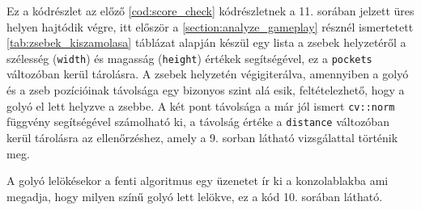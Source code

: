 \par Ez a kódrészlet az előző \ref{cod:score_check} kódrészletnek a 11. sorában jelzett üres helyen hajtódik végre, itt először a \ref{section:analyze_gameplay} résznél ismertetett \ref{tab:zsebek_kiszamolasa} táblázat alapján készül egy lista a zsebek helyzetéről a szélesség (\lstinline{width}) és magasság (\lstinline{height}) értékek segítségével, ez a \lstinline{pockets} változóban kerül tárolásra. A zsebek helyzetén végigiterálva, amennyiben a golyó és a zseb pozícióinak távolsága egy bizonyos szint alá esik, feltételezhető, hogy a golyó el lett helyzve a zsebbe. A két pont távolsága a már jól ismert \lstinline{cv::norm} függvény\cite{opencv_docs} segítségével számolható ki, a távolság értéke a \lstinline{distance} változóban kerül tárolásra az ellenőrzéshez, amely a 9. sorban látható vizsgálattal történik meg.
\par A golyó lelökésekor a fenti algoritmus egy üzenetet ír ki a konzolablakba ami megadja, hogy milyen színű golyó lett lelökve, ez a kód 10. sorában látható.